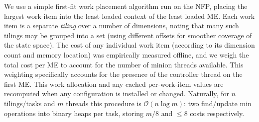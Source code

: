\documentclass[
sigconf,natbib=false
]{acmart}
\newcommand{\approachshort}{OPaL}
\begin{document}
We use a simple first-fit work placement algorithm run on the NFP, placing the largest work item into the least loaded context of the least loaded ME.
Each work item is a separate \emph{tiling} over a number of dimensions, noting that many such tilings may be grouped into a set (using different offsets for smoother coverage of the state space).
The cost of any individual work item (according to its dimension count and memory location) was empirically measured offline, and we weigh the total cost per ME to account for the number of minion threads available.
This weighting specifically accounts for the presence of the controller thread on the first ME.
This work allocation and any cached per-work-item values are recomputed when any configuration is installed or changed.
Naturally, for $n$ tilings/tasks and $m$ threads this procedure is $\mathcal{O}{\left(n\log{m}\right)}$: two find/update min operations into binary heaps per task, storing $m/8$ and $\le8$ costs respectively.

%

%
%
%
\end{document}
